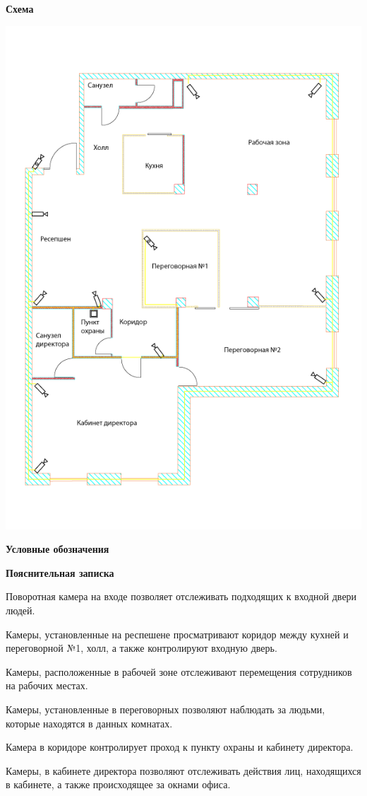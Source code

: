 \documentclass[a4paper,14pt]{extarticle}
\begin{document}
    \begin{center}
        \textbf{Схема}
    \end{center}
    \vspace{-6ex}
    \begin{center}
        \includegraphics[scale=0.65, angle=90]{pics/Cams.png}
    \end{center}
    \textbf{Условные обозначения}
    \begin{center}
        
    \end{center}
    \textbf{Пояснительная записка}
    \begin{spacing}{1.25}
        Поворотная камера на входе позволяет отслеживать подходящих к входной двери людей.

        Камеры, установленные на респешене просматривают коридор между кухней и переговорной №1, холл, а также контролируют входную дверь.

        Камеры, расположенные в рабочей зоне отслеживают перемещения сотрудников на рабочих местах. 

        Камеры, установленные в переговорных позволяют наблюдать за людьми, которые находятся в данных комнатах.

        Камера в коридоре контролирует проход к пункту охраны и кабинету директора.

        Камеры, в кабинете директора позволяют отслеживать действия лиц, находящихся в кабинете, а также происходящее за окнами офиса. 
    \end{spacing}
\end{document}
